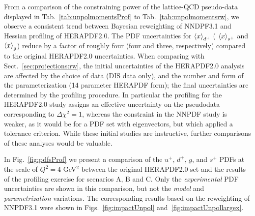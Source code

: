 From a comparison of the constraining power of the lattice-QCD pseudo-data  
displayed in Tab.~\ref{tab:unpolmomentsProf} to Tab.~\ref{tab:unpolmomentsrw},
we observe a consistent trend between Bayesian reweighting of NNDPF3.1 and 
Hessian profiling of HERAPDF2.0.
%
The PDF uncertainties for $\left\langle x\right\rangle_{d^+}$ ( $\left\langle x\right\rangle_{s^+}$
and  $\left\langle x\right\rangle_g$) reduce by a factor of roughly
four (four and three, respectively) compared to the original
HERAPDF2.0 uncertainties.
%
When comparing with Sect.~\ref{sec:projections:rw},
the initial uncertainties of the HERAPDF2.0  analysis 
are affected by the choice of data (DIS data only), and 
the number and form of the parameterization (14 parameter HERAPDF form);
the final uncertainties are determined by the profiling procedure. 
%
In particular the profiling for the HERAPDF2.0 study assigns an effective 
uncertainty on the pseudodata corresponding to $\Delta\chi^2=1$, whereas the 
constraint in the NNPDF study is weaker, as it would be for a PDF set with 
eigenvectors, but which applied a tolerance criterion. 
%
While these initial studies are instructive, 
further comparisons of these analyses would be valuable. 

In Fig.~\ref{fig:pdfsProf} we present a comparison of the
$u^+$, $d^+$, $g$, and $s^+$ PDFs at the scale of $Q^2=4$ GeV$^2$
between the original  HERAPDF2.0 set and the results of the profiling
exercise for scenarios A, B and C.
%
Only the {\it experimental} PDF uncertainties are shown in this comparison,
but not the {\it model} and {\it parametrization} variations.
%
The corresponding results based on the reweighting
of NNPDF3.1 were shown in Figs.~\ref{fig:impactUnpol}
and~\ref{fig:impactUnpollargex}.

